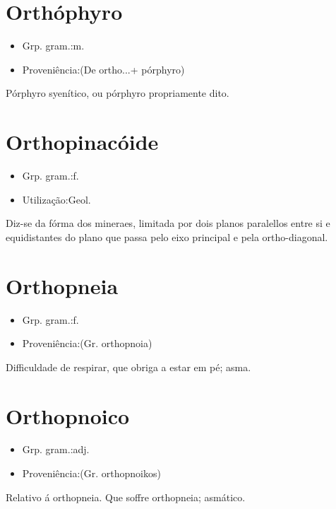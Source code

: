 \section{Orthóphyro}
\begin{itemize}
\item {Grp. gram.:m.}
\end{itemize}
\begin{itemize}
\item {Proveniência:(De \textunderscore ortho...\textunderscore  + \textunderscore pórphyro\textunderscore )}
\end{itemize}
Pórphyro syenítico, ou pórphyro propriamente dito.
\section{Orthopinacóide}
\begin{itemize}
\item {Grp. gram.:f.}
\end{itemize}
\begin{itemize}
\item {Utilização:Geol.}
\end{itemize}
Diz-se da fórma dos mineraes, limitada por dois planos paralellos entre si e equidistantes do plano que passa pelo eixo principal e pela ortho-diagonal.
\section{Orthopneia}
\begin{itemize}
\item {Grp. gram.:f.}
\end{itemize}
\begin{itemize}
\item {Proveniência:(Gr. \textunderscore orthopnoia\textunderscore )}
\end{itemize}
Difficuldade de respirar, que obriga a estar em pé; asma.
\section{Orthopnoico}
\begin{itemize}
\item {Grp. gram.:adj.}
\end{itemize}
\begin{itemize}
\item {Proveniência:(Gr. \textunderscore orthopnoikos\textunderscore )}
\end{itemize}
Relativo á orthopneia.
Que soffre orthopneia; asmático.
